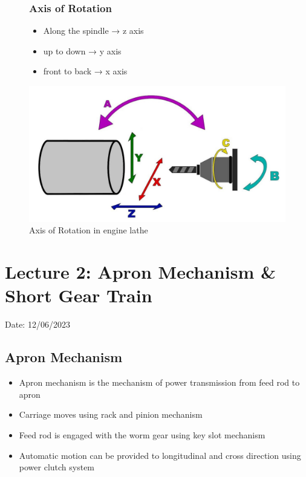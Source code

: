 \documentclass{article}
\begin{document}
\vspace*{0.5cm}
\begin{figure}[ht]
  \subsubsection*{Axis of Rotation}
  \centering
  \begin{minipage}{0.45\linewidth}
      \begin{itemize}
        \item Along the spindle → z axis 
        \item up to down → y axis 
        \item front to back → x axis 
      \end{itemize}
  \end{minipage}%
  \begin{minipage}{0.55\linewidth}
      \centering
      \includegraphics[width=\linewidth]{img/axis.jpeg}
      \caption{Axis of Rotation in engine lathe}
      \label{fig:axis}
  \end{minipage}
\end{figure}




\newpage

\section{Lecture 2: Apron Mechanism \& Short Gear Train}
\hfill Date: 12/06/2023

\subsection*{Apron Mechanism}
\begin{itemize}
  \item  Apron mechanism is the mechanism of power 
  transmission from feed rod to apron
  \item Carriage moves using rack and pinion 
  mechanism
  \item Feed rod is engaged with the worm gear 
  using key slot mechanism
  \item Automatic motion can be provided to 
  longitudinal and cross direction using power 
  clutch system
\end{itemize}
\end{document}
